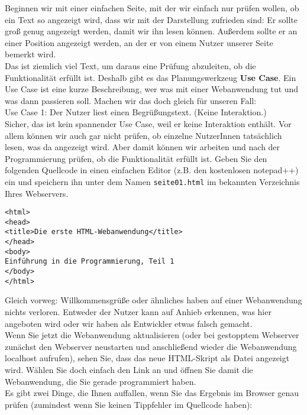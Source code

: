 Beginnen wir mit einer einfachen Seite, mit der wir einfach nur prüfen wollen, ob ein Text so angezeigt wird, dass wir mit der Darstellung zufrieden sind: Er sollte groß genug angezeigt werden, damit wir ihn lesen können. Außerdem sollte er an einer Position angezeigt werden, an der er von einem Nutzer unserer Seite bemerkt wird.\\

Das ist ziemlich viel Text, um daraus eine Prüfung abzuleiten, ob die Funktionalität erfüllt ist. Deshalb gibt es das Planungswerkzeug \textbf{Use Case}. Ein Use Case ist eine kurze Beschreibung, wer was mit einer Webanwendung tut und was dann passieren soll. Machen wir das doch gleich für unseren Fall:\\

Use Case 1: Der Nutzer liest einen Begrüßungstext. (Keine Interaktion.)\\

Sicher, das ist kein spannender Use Case, weil er keine Interaktion enthält. Vor allem können wir auch gar nicht prüfen, ob einzelne NutzerInnen tatsächlich lesen, was da angezeigt wird. Aber damit können wir arbeiten und nach der Programmierung prüfen, ob die Funktionalität erfüllt ist. Geben Sie den folgenden Quellcode in einen einfachen Editor (z.B. den kostenlosen notepad++) ein und speichern ihn unter dem Namen \verb|seite01.html| im bekannten Verzeichnis Ihres Webservers.

\begin{verbatim}
<html>
<head>
<title>Die erste HTML-Webanwendung</title>
</head>
<body>
Einführung in die Programmierung, Teil 1
</body>
</html>
\end{verbatim}

Gleich vorweg: Willkommensgrüße oder ähnliches haben auf einer Webanwendung nichts verloren. Entweder der Nutzer kann auf Anhieb erkennen, was hier angeboten wird oder wir haben als Entwickler etwas falsch gemacht.\\

Wenn Sie jetzt die Webanwendung aktualisieren (oder bei gestopptem Webserver zunächst den Webserver neustarten und anschließend wieder die Webanwendung localhost aufrufen), sehen Sie, dass das neue HTML-Skript als Datei angezeigt wird. Wählen Sie doch einfach den \glqq{}Link\grqq{} an und öffnen Sie damit die Webanwendung, die Sie gerade programmiert haben.\\

Es gibt zwei Dinge, die Ihnen auffallen, wenn Sie das Ergebnis im Browser genau prüfen (zumindest wenn Sie keinen Tippfehler im Quellcode haben): \\


